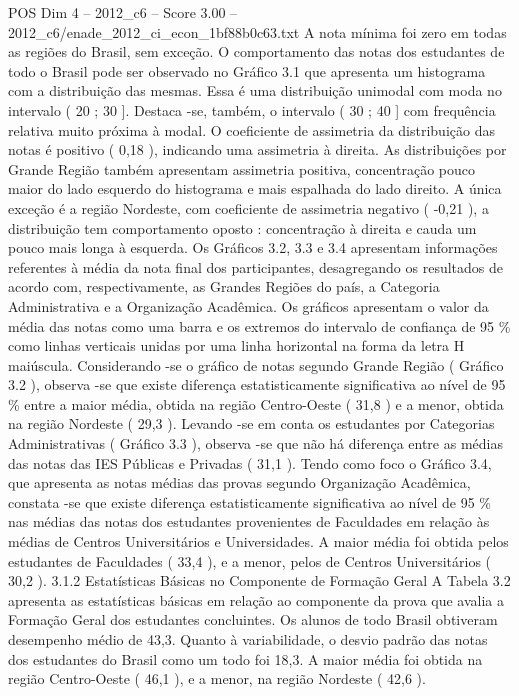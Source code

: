 \begin{textsample}{POS Dim 4 – 2012\_c6 – Score 3.00 – 2012\_c6/enade\_2012\_ci\_econ\_1bf88b0c63.txt}
A nota mínima foi zero em todas as regiões do Brasil, sem exceção.
O comportamento das notas dos estudantes de todo o Brasil pode ser observado no Gráfico 3.1 que apresenta um histograma com a distribuição das mesmas.
Essa é uma distribuição unimodal com moda no intervalo ( 20 ; 30 ].
Destaca -se, também, o intervalo ( 30 ; 40 ] com frequência relativa muito próxima à modal.
O coeficiente de assimetria da distribuição das notas é positivo ( 0,18 ), indicando uma assimetria à direita.
As distribuições por Grande Região também apresentam assimetria positiva, concentração pouco maior do lado esquerdo do histograma e mais espalhada do lado direito.
A única exceção é a região Nordeste, com coeficiente de assimetria negativo ( -0,21 ), a distribuição tem comportamento oposto : concentração à direita e cauda um pouco mais longa à esquerda.
Os Gráficos 3.2, 3.3 e 3.4 apresentam informações referentes à média da nota final dos participantes, desagregando os resultados de acordo com, respectivamente, as Grandes Regiões do país, a Categoria Administrativa e a Organização Acadêmica.
Os gráficos apresentam o valor da média das notas como uma barra e os extremos do intervalo de confiança de 95 \% como linhas verticais unidas por uma linha horizontal na forma da letra H maiúscula.
Considerando -se o gráfico de notas segundo Grande Região ( Gráfico 3.2 ), observa -se que existe diferença estatisticamente significativa ao nível de 95 \% entre a maior média, obtida na região Centro-Oeste ( 31,8 ) e a menor, obtida na região Nordeste ( 29,3 ).
Levando -se em conta os estudantes por Categorias Administrativas ( Gráfico 3.3 ), observa -se que não há diferença entre as médias das notas das IES Públicas e Privadas ( 31,1 ).
Tendo como foco o Gráfico 3.4, que apresenta as notas médias das provas segundo Organização Acadêmica, constata -se que existe diferença estatisticamente significativa ao nível de 95 \% nas médias das notas dos estudantes provenientes de Faculdades em relação às médias de Centros Universitários e Universidades.
A maior média foi obtida pelos estudantes de Faculdades ( 33,4 ), e a menor, pelos de Centros Universitários ( 30,2 ). 3.1.2 Estatísticas Básicas no Componente de Formação Geral A Tabela 3.2 apresenta as estatísticas básicas em relação ao componente da prova que avalia a Formação Geral dos estudantes concluintes.
Os alunos de todo Brasil obtiveram desempenho médio de 43,3.
Quanto à variabilidade, o desvio padrão das notas dos estudantes do Brasil como um todo foi 18,3.
A maior média foi obtida na região Centro-Oeste ( 46,1 ), e a menor, na região Nordeste ( 42,6 ).

\end{textsample}
